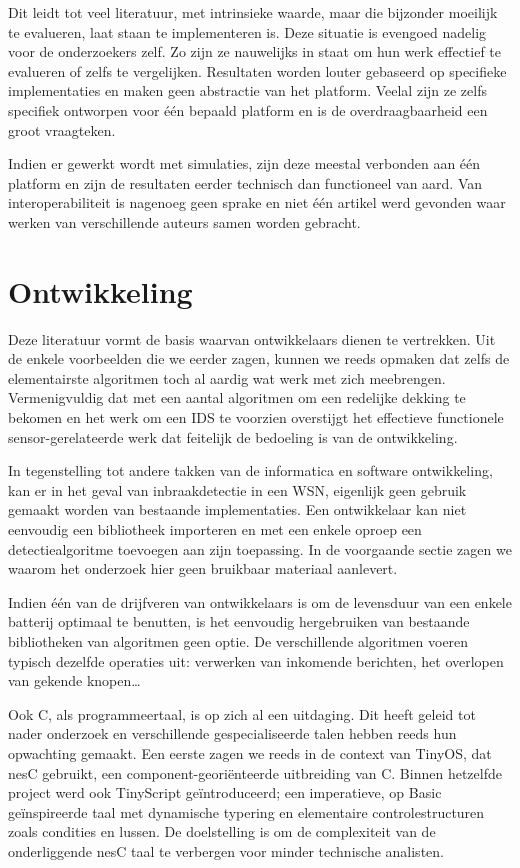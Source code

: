 Dit leidt tot veel literatuur, met intrinsieke waarde, maar die bijzonder
moeilijk te evalueren, laat staan te implementeren is. Deze situatie is
evengoed nadelig voor de onderzoekers zelf. Zo zijn ze nauwelijks in staat om
hun werk effectief te evalueren of zelfs te vergelijken. Resultaten worden
louter gebaseerd op specifieke implementaties en maken geen abstractie van het
platform. Veelal zijn ze zelfs specifiek ontworpen voor \'e\'en bepaald
platform en is de overdraagbaarheid een groot vraagteken.

Indien er gewerkt wordt met simulaties, zijn deze meestal verbonden aan \'e\'en
platform en zijn de resultaten eerder technisch dan functioneel van aard. Van
interoperabiliteit is nagenoeg geen sprake en niet \'e\'en artikel werd
gevonden waar werken van verschillende auteurs samen worden gebracht.

\section{Ontwikkeling}
\label{section:problem-develop}

Deze literatuur vormt de basis waarvan ontwikkelaars dienen te vertrekken. Uit
de enkele voorbeelden die we eerder zagen, kunnen we reeds opmaken dat zelfs de
elementairste algoritmen toch al aardig wat werk met zich meebrengen.
Vermenigvuldig dat met een aantal algoritmen om een redelijke dekking te
bekomen en het werk om een IDS te voorzien overstijgt het effectieve
functionele sensor-gerelateerde werk dat feitelijk de bedoeling is van de
ontwikkeling.

In tegenstelling tot andere takken van de informatica en software ontwikkeling,
kan er in het geval van inbraakdetectie in een WSN, eigenlijk geen gebruik
gemaakt worden van bestaande implementaties. Een ontwikkelaar kan niet
eenvoudig een bibliotheek importeren en met een enkele oproep een
detectiealgoritme toevoegen aan zijn toepassing. In de voorgaande sectie zagen
we waarom het onderzoek hier geen bruikbaar materiaal aanlevert.

Indien \'e\'en van de drijfveren van ontwikkelaars is om de levensduur van een
enkele batterij optimaal te benutten, is het eenvoudig hergebruiken van
bestaande bibliotheken van algoritmen geen optie. De verschillende algoritmen
voeren typisch dezelfde operaties uit: verwerken van inkomende berichten, het
overlopen van gekende knopen\dots

Ook C, als programmeertaal, is op zich al een uitdaging. Dit heeft geleid tot
nader onderzoek en verschillende gespecialiseerde talen hebben reeds hun
opwachting gemaakt. Een eerste zagen we reeds in de context van TinyOS, dat
nesC \citep{gay2003nesc} gebruikt, een component-geori\"enteerde uitbreiding
van C. Binnen hetzelfde project werd ook TinyScript \citep{levis2004tinyscript}
ge\"introduceerd; een imperatieve, op Basic ge\"inspireerde taal met dynamische
typering en elementaire controlestructuren zoals condities en lussen. De
doelstelling is om de complexiteit van de onderliggende nesC taal te verbergen
voor minder technische analisten.

